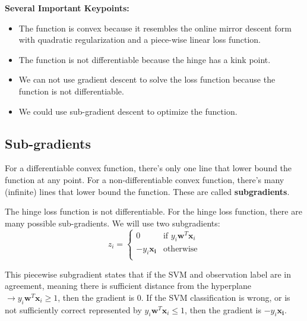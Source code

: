 \documentclass[11pt]{article}
\begin{document}
\textbf{Several Important Keypoints:}
\begin{itemize}
    \item The function is convex because it resembles the online mirror descent form with quadratic regularization and a piece-wise linear loss function.
    \item The function is not differentiable because the hinge has a kink point.
    \item We can not use gradient descent to solve the loss function because the function is not differentiable.
    \item We could use sub-gradient descent to optimize the function.
\end{itemize}

\subsection{Sub-gradients}
For a differentiable convex function, there's only one line that lower bound the function at any point.
For a non-differentiable convex function, there's many (infinite) lines that lower bound the function. These are called \textbf{subgradients}.


The hinge loss function is not differentiable. For the hinge loss function, there are many possible sub-gradients. 
We will use two subgradients:
\begin{equation}
  z_i =
    \begin{cases}
      0 & \text{if } y_i \mathbf{w}^T \mathbf{x}_i\\
      -y_i \mathbf{x_i} & \text{otherwise}\\
    \end{cases}       
\end{equation}

This piecewise subgradient states that if the SVM and observation label are in agreement, meaning there is sufficient distance from the hyperplane $\rightarrow y_i \mathbf{w}^T \mathbf{x}_i \geq 1$, then the gradient is 0. If the SVM classification is wrong, or is not sufficiently correct represented by $y_i \mathbf{w}^T \mathbf{x}_i \leq 1$, then the gradient is $-y_i \mathbf{x_i}$.
\end{document}
